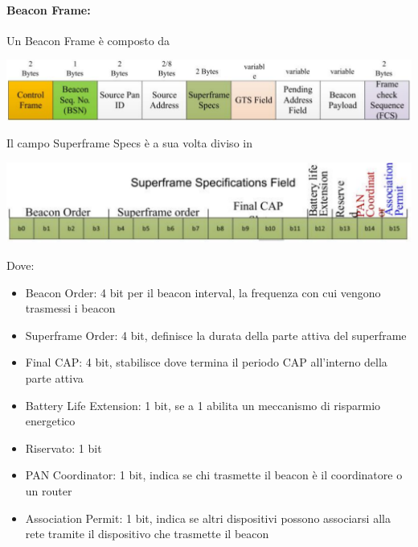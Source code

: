 \paragraph{Beacon Frame:} Un Beacon Frame è composto da
\begin{center}
	\includegraphics[width=0.95\linewidth]{img/wpan/zbframe}
\end{center}

Il campo Superframe Specs è a sua volta diviso in 
\begin{center}
	\includegraphics[width=0.75\linewidth]{img/wpan/zssf}
\end{center}

Dove:
\begin{itemize}
	\item Beacon Order: 4 bit per il beacon interval, la frequenza con cui vengono trasmessi i beacon
	\item Superframe Order: 4 bit, definisce la durata della parte attiva del superframe
	\item Final CAP: 4 bit, stabilisce dove termina il periodo CAP all'interno della parte attiva
	\item Battery Life Extension: 1 bit, se a 1 abilita un meccanismo di risparmio energetico
	\item Riservato: 1 bit
	\item PAN Coordinator: 1 bit, indica se chi trasmette il beacon è il coordinatore o un router
	\item Association Permit: 1 bit, indica se altri dispositivi possono associarsi alla rete tramite il dispositivo che trasmette il beacon
\end{itemize}

\newpage

